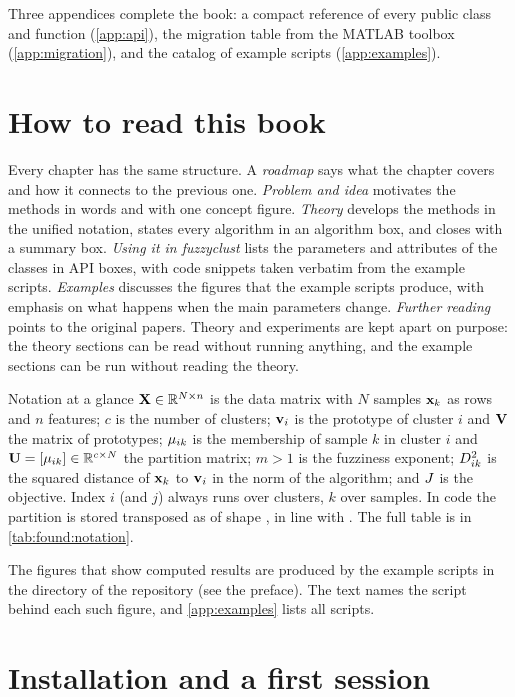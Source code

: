 Three appendices complete the book: a compact reference of every public class and function (\cref{app:api}), the migration table from the MATLAB toolbox (\cref{app:migration}), and the catalog of example scripts (\cref{app:examples}).

\section{How to read this book}\label{sec:intro:reading}

Every chapter has the same structure. A \emph{roadmap} says what the chapter covers and how it connects to the previous one. \emph{Problem and idea} motivates the methods in words and with one concept figure. \emph{Theory} develops the methods in the unified notation, states every algorithm in an algorithm box, and closes with a summary box. \emph{Using it in fuzzyclust} lists the parameters and attributes of the classes in API boxes, with code snippets taken verbatim from the example scripts. \emph{Examples} discusses the figures that the example scripts produce, with emphasis on what happens when the main parameters change. \emph{Further reading} points to the original papers. Theory and experiments are kept apart on purpose: the theory sections can be read without running anything, and the example sections can be run without reading the theory.

\begin{hintbox}{Notation at a glance}
$\mathbf{X}\in\mathbb{R}^{N\times n}$ is the data matrix with $N$ samples $\mathbf{x}_k$ as rows and $n$ features; $c$ is the number of clusters; $\mathbf{v}_i$ is the prototype of cluster $i$ and $\mathbf{V}$ the matrix of prototypes; $\mu_{ik}$ is the membership of sample $k$ in cluster $i$ and $\mathbf{U}=[\mu_{ik}]\in\mathbb{R}^{c\times N}$ the partition matrix; $m>1$ is the fuzziness exponent; $D^2_{ik}$ is the squared distance of $\mathbf{x}_k$ to $\mathbf{v}_i$ in the norm of the algorithm; and $J$ is the objective. Index $i$ (and $j$) always runs over clusters, $k$ over samples. In code the partition is stored transposed as  of shape , in line with . The full table is in \cref{tab:found:notation}.
\end{hintbox}

The figures that show computed results are produced by the example scripts in the  directory of the repository (see the preface). The text names the script behind each such figure, and \cref{app:examples} lists all scripts.

\section{Installation and a first session}\label{sec:intro:install}

